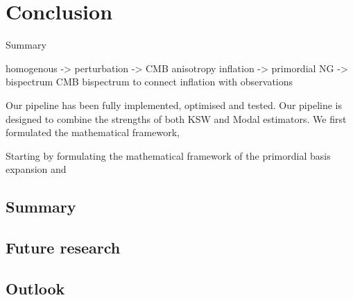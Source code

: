\chapter{Conclusion}

Summary

homogenous -> perturbation -> CMB anisotropy
inflation -> primordial NG -> bispectrum
CMB bispectrum to connect inflation with observations



Our pipeline has been fully implemented, optimised and tested.
Our pipeline is designed to combine the strengths of both KSW and Modal estimators. We first formulated the mathematical framework, 

Starting by formulating the mathematical framework of the primordial basis expansion and 



\section*{Summary}

\section*{Future research}

\section*{Outlook}